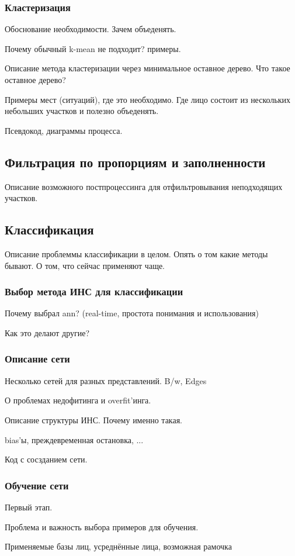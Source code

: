 \documentclass[12pt]{report}
\begin{document}
\subsubsection{Кластеризация}
Обоснование необходимости. Зачем объеденять.	

Почему обычный k-mean не подходит? примеры.

Описание метода кластеризации через минимальное оставное дерево. Что такое оставное дерево?

Примеры мест (ситуаций), где это необходимо. Где лицо состоит из нескольких небольших участков и полезно объеденять.

Псевдокод, диаграммы процесса.
\subsection{Фильтрация по пропорциям и заполненности}
Описание возможного постпроцессинга для отфильтровывания неподходящих участков.
\subsection{Классификация}
Описание проблеммы классификации в целом.
Опять о том какие методы бывают. О том, что сейчас применяют чаще.
\subsubsection{Выбор метода ИНС для классификации}
Почему выбрал ann? (real-time, простота понимания и использования)

Как это делают другие?
\subsubsection{Описание сети}
Несколько сетей для разных представлений. B/w, Edges

О проблемах недофитинга и overfit'инга.

Описание структуры ИНС. Почему именно такая.

bias'ы, преждевременная остановка, ...

Код с сосзданием сети.
\subsubsection{Обучение сети}
Первый этап.

Проблема и важность выбора примеров для обучения.

Применяемые базы лиц, усреднённые лица, возможная рамочка
\end{document}
